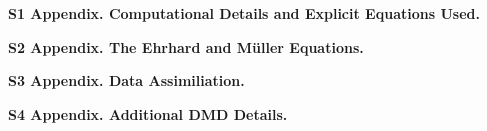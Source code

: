 \documentclass[10pt,letterpaper]{article}
\begin{document}
\vspace{6mm}
\noindent\textbf{S1 Appendix. Computational Details and Explicit Equations Used.}
\vspace{8mm}

\noindent\textbf{S2 Appendix. The Ehrhard and M\"{u}ller Equations.}
\vspace{8mm}

\noindent\textbf{S3 Appendix. Data Assimiliation.}
\vspace{8mm}

\noindent\textbf{S4 Appendix. Additional DMD Details.}
\end{document}
